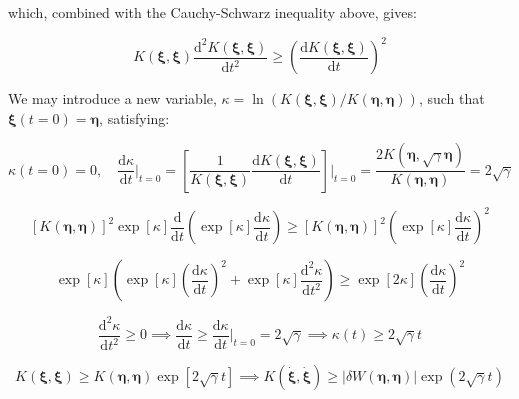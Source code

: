which, combined with the Cauchy-Schwarz inequality above, gives:

\begin{equation}
    K(\boldsymbol{\xi},\boldsymbol{\xi})\frac{\mathrm{d}^2K(\boldsymbol{\xi},\boldsymbol{\xi})}{\mathrm{d}t^2}\geq\left(\frac{\mathrm{d}K(\boldsymbol{\xi},\boldsymbol{\xi})}{\mathrm{d}t}\right)^2
\end{equation}

We may introduce a new variable, $\kappa=\ln{(K(\boldsymbol{\xi},\boldsymbol{\xi})/K(\boldsymbol{\eta},\boldsymbol{\eta}))}$, such that $\boldsymbol{\xi}(t=0)=\boldsymbol{\eta}$, satisfying:

\begin{equation}
    \kappa(t=0)=0,\quad\frac{\mathrm{d}\kappa}{\mathrm{d}t}\biggr|_{t=0}=\left[\frac{1}{K(\boldsymbol{\xi},\boldsymbol{\xi})}\frac{\mathrm{d}K(\boldsymbol{\xi},\boldsymbol{\xi})}{\mathrm{d}t}\right]\biggr|_{t=0}=\frac{2K(\boldsymbol{\eta},\sqrt{\gamma}\boldsymbol{\eta})}{K(\boldsymbol{\eta},\boldsymbol{\eta})}=2\sqrt{\gamma}
\end{equation}

\begin{equation}
    \left[K(\boldsymbol{\eta},\boldsymbol{\eta})\right]^2\exp{\left[\kappa\right]}\frac{\mathrm{d}}{\mathrm{d}t}\left(\exp{[\kappa]}\frac{\mathrm{d}\kappa}{\mathrm{d}t}\right)\geq\left[K(\boldsymbol{\eta},\boldsymbol{\eta})\right]^2\left(\exp{[\kappa]}\frac{\mathrm{d}\kappa}{\mathrm{d}t}\right)^2
\end{equation}

\begin{equation}
    \exp{[\kappa]}\left(\exp{[\kappa]}\left(\frac{\mathrm{d}\kappa}{\mathrm{d}t}\right)^2+\exp{[\kappa]}\frac{\mathrm{d}^2\kappa}{\mathrm{d}t^2}\right)\geq\exp{[2\kappa]}\left(\frac{\mathrm{d}\kappa}{\mathrm{d}t}\right)^2
\end{equation}

\begin{equation}
    \frac{\mathrm{d}^2\kappa}{\mathrm{d}t^2}\geq0\implies\frac{\mathrm{d}\kappa}{\mathrm{d}t}\geq\frac{\mathrm{d}\kappa}{\mathrm{d}t}\biggr|_{t=0}=2\sqrt{\gamma}\implies\kappa(t)\geq 2\sqrt{\gamma}t
\end{equation}

\begin{equation}
    K(\boldsymbol{\xi},\boldsymbol{\xi})\geq K(\boldsymbol{\eta},\boldsymbol{\eta})\exp{[2\sqrt{\gamma}t]}\implies K(\dot{\boldsymbol{\xi}},\dot{\boldsymbol{\xi}})\geq|\delta W(\boldsymbol{\eta},\boldsymbol{\eta})|\exp{\left(2\sqrt{\gamma}t\right)}
\end{equation}

